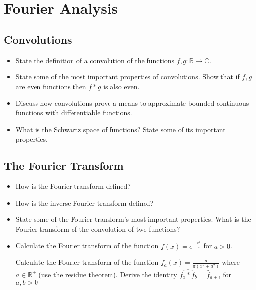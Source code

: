 \section{Fourier Analysis}

\subsection{Convolutions}

\begin{itemize}

	\item State the definition of a convolution of the functions $ f, g: \mathbb{R} \to \mathbb{C} $.
	
	\item State some of the most important properties of convolutions. Show that if $ f, g $ are even functions then $ f*g $ is also even.
	
	\item Discuss how convolutions prove a means to approximate bounded continuous functions with differentiable functions. 
	
	\item What is the Schwartz space of functions? State some of its important properties.

\end{itemize}

\subsection{The Fourier Transform}

\begin{itemize}

	\item How is the Fourier transform defined? 
	
	\item How is the inverse Fourier transform defined? 
	
	\item State some of the Fourier transform's most important properties. What is the Fourier transform of the convolution of two functions? 
	
	\item 	Calculate the Fourier transform of the function $ f(x) = e^{-\frac{x^2}{a}} $ for $ a > 0 $.
	
	Calculate the Fourier transform of the function $ f_{a}(x) = \frac{a}{\pi (x^2 + a^2)} $ where $ a \in \mathbb{R}^{+} $ (use the residue theorem). Derive the identity $ \widehat{f_{a} * f_{b}} = \widehat{f}_{a+b} $ for $ a, b > 0 $
	
\end{itemize}


